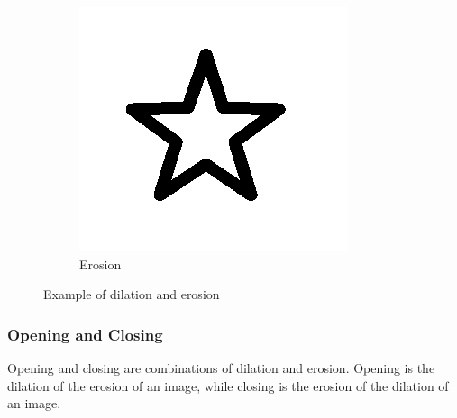 \begin{figure}[h]
    \begin{subfigure}{.33\textwidth}
        \centering
        \includegraphics[width=.9\linewidth]{images/literature/erosion}
        \caption{Erosion}
    \end{subfigure}
    \caption{Example of dilation and erosion}
    \label{fig:star_dilate_erode}
\end{figure}



\subsubsection{Opening and Closing}
Opening and closing are combinations of dilation and erosion. Opening is the dilation of the erosion of an image, while closing is the erosion of the dilation of an image. 

